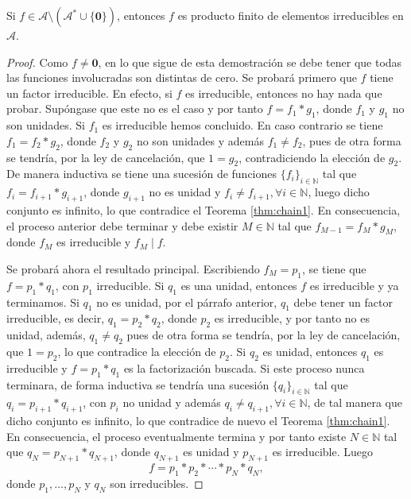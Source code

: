 \begin{proposition}
Si $f \in \mathcal{A}\setminus (\mathcal{A}^* \cup \{ \mathbf{0} \})$, entonces $f$ es producto finito de elementos irreducibles en $\mathcal{A}$.
\end{proposition}
\begin{proof}
Como $f \ne \mathbf{0}$, en lo que sigue de esta demostración se debe tener que todas las funciones involucradas son distintas de cero. Se probará primero que $f$ tiene un factor irreducible. En efecto, si $f$ es irreducible, entonces no hay nada que probar. Supóngase que este no es el caso y por tanto $f=f_1*g_1$, donde $f_1$ y $g_1$ no son unidades. Si $f_1$ es irreducible hemos concluido. En caso contrario se tiene $f_1=f_2*g_2$, donde $f_2$ y $g_2$ no son unidades y además $f_1 \ne f_2$, pues de otra forma se tendría, por la ley de cancelación, que $1=g_2$, contradiciendo la elección de $g_2$. De manera inductiva se tiene una sucesión de funciones $\{ f_i \}_{i \in \mathbb{N}}$ tal que $f_i=f_{i+1}*g_{i+1}$, donde $g_{i+1}$ no es unidad y $f_i \ne f_{i+1}, \forall i \in \mathbb{N}$, luego dicho conjunto es infinito, lo que contradice el Teorema \ref{thm:chain1}. En consecuencia, el proceso anterior debe terminar y debe existir $M \in \mathbb{N}$ tal que $f_{M-1}=f_M*g_M$, donde $f_M$ es irreducible y $f_M \mid f$.
\bigskip

Se probará ahora el resultado principal. Escribiendo $f_M=p_1$, se tiene que $f=p_1*q_1$, con $p_1$ irreducible. Si $q_1$ es una unidad, entonces $f$ es irreducible y ya terminamos. Si $q_1$ no es unidad, por el párrafo anterior, $q_1$ debe tener un factor irreducible, es decir, $q_1=p_2*q_2$, donde $p_2$ es irreducible, y por tanto no es unidad, además, $q_1 \ne q_2$ pues de otra forma se tendría, por la ley de cancelación, que $1=p_2$, lo que contradice la elección de $p_2$. Si $q_2$ es unidad, entonces $q_1$ es irreducible y $f=p_1*q_1$ es la factorización buscada. Si este proceso nunca terminara, de forma inductiva se tendría una sucesión $\{ q_i \}_{i \in \mathbb{N}}$ tal que $q_i=p_{i+1}*q_{i+1}$, con $p_i$ no unidad y además $q_i \ne q_{i+1},\forall i \in \mathbb{N}$, de tal manera que dicho conjunto es infinito, lo que contradice de nuevo el Teorema \ref{thm:chain1}. En consecuencia, el proceso eventualmente termina y por tanto existe $N \in \mathbb{N}$ tal que $q_N=p_{N+1}*q_{N+1}$, donde $q_{N+1}$ es unidad y $p_{N+1}$ es irreducible. Luego
\begin{equation*}
    f=p_1*p_2*\cdots*p_N*q_N,
\end{equation*}
donde $p_1,\ldots,p_{N}$ y $q_N$ son irreducibles.
\end{proof}

